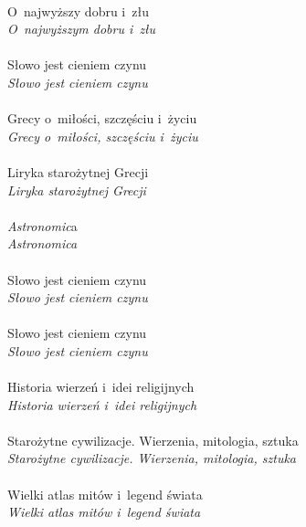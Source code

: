 \documentclass[a4paper,11pt]{article}
\numberwithin{equation}{section}
\begin{document}
 \\
\Jest O~najwyższy dobru i~złu \\
\PowinnoByc \textit{O~najwyższym dobru i~złu} \\
 \\
\Jest Słowo jest cieniem czynu \\
\PowinnoByc \textit{Słowo jest cieniem czynu} \\
 \\
\Jest Grecy o~miłości, szczęściu i~życiu \\
\PowinnoByc \textit{Grecy o~miłości, szczęściu i~życiu} \\
 \\
\Jest Liryka starożytnej Grecji \\
\PowinnoByc \textit{Liryka starożytnej Grecji} \\
 \\
\Jest \textit{Astronomic}a \\
\PowinnoByc \textit{Astronomica} \\
 \\
\Jest Słowo jest cieniem czynu \\
\PowinnoByc \textit{Słowo jest cieniem czynu} \\
 \\
\Jest Słowo jest cieniem czynu \\
\PowinnoByc \textit{Słowo jest cieniem czynu} \\
 \\
\Jest Historia wierzeń i~idei religijnych \\
\PowinnoByc \textit{Historia wierzeń i~idei religijnych} \\
 \\
\Jest Starożytne cywilizacje. Wierzenia, mitologia, sztuka \\
\PowinnoByc \textit{Starożytne cywilizacje. Wierzenia, mitologia, sztuka} \\
 \\
\Jest Wielki atlas mitów i~legend świata \\
\PowinnoByc \textit{Wielki atlas mitów i~legend świata} \\



\end{document}
